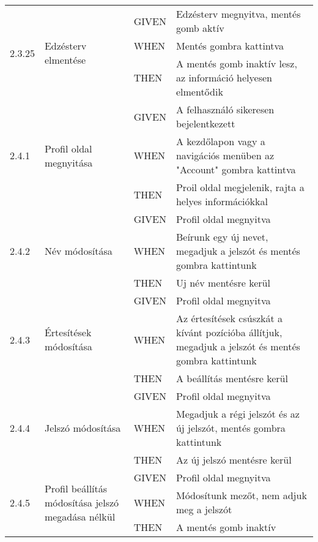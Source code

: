\begin{center}
\begin{longtable}{ | p{} | p{} | p{} | p{} | }
			\multirow{3}{*}{2.3.25} 
			& \multirow{3}{=}{Edzésterv elmentése} 
			& GIVEN 
			& Edzésterv megnyitva, mentés gomb aktív \\
			\cline{3-4}
			& & WHEN 
			& Mentés gombra kattintva \\
			\cline{3-4}
			& & THEN 
			& A mentés gomb inaktív lesz, az információ helyesen elmentődik \\
			\hline




			\multirow{3}{*}{2.4.1} 
			& \multirow{3}{=}{Profil oldal megnyitása} 
			& GIVEN 
			& A felhasználó sikeresen bejelentkezett \\
			\cline{3-4}
			& & WHEN 
			& A kezdőlapon vagy a navigációs menüben az "Account" gombra kattintva \\
			\cline{3-4}
			& & THEN 
			& Proil oldal megjelenik, rajta a helyes információkkal \\
			\hline

			\multirow{3}{*}{2.4.2} 
			& \multirow{3}{=}{Név módosítása} 
			& GIVEN 
			& Profil oldal megnyitva \\
			\cline{3-4}
			& & WHEN 
			& Beírunk egy új nevet, megadjuk a jelszót és mentés gombra kattintunk \\
			\cline{3-4}
			& & THEN 
			& Uj név mentésre kerül \\
			\hline

			\multirow{3}{*}{2.4.3} 
			& \multirow{3}{=}{Értesítések módosítása} 
			& GIVEN 
			& Profil oldal megnyitva \\
			\cline{3-4}
			& & WHEN 
			& Az értesítések csúszkát a kívánt pozícióba állítjuk, megadjuk a jelszót és mentés gombra kattintunk \\
			\cline{3-4}
			& & THEN 
			& A beállítás mentésre kerül \\
			\hline

			\multirow{3}{*}{2.4.4} 
			& \multirow{3}{=}{Jelszó módosítása} 
			& GIVEN 
			& Profil oldal megnyitva \\
			\cline{3-4}
			& & WHEN 
			& Megadjuk a régi jelszót és az új jelszót, mentés gombra kattintunk \\
			\cline{3-4}
			& & THEN 
			& Az új jelszó mentésre kerül \\
			\hline

			\multirow{3}{*}{2.4.5} 
			& \multirow{3}{=}{Profil beállítás módosítása jelszó megadása nélkül} 
			& GIVEN 
			& Profil oldal megnyitva \\
			\cline{3-4}
			& & WHEN 
			& Módosítunk mezőt, nem adjuk meg a jelszót \\
			\cline{3-4}
			& & THEN 
			& A mentés gomb inaktív
			

\end{longtable}
\end{center}
